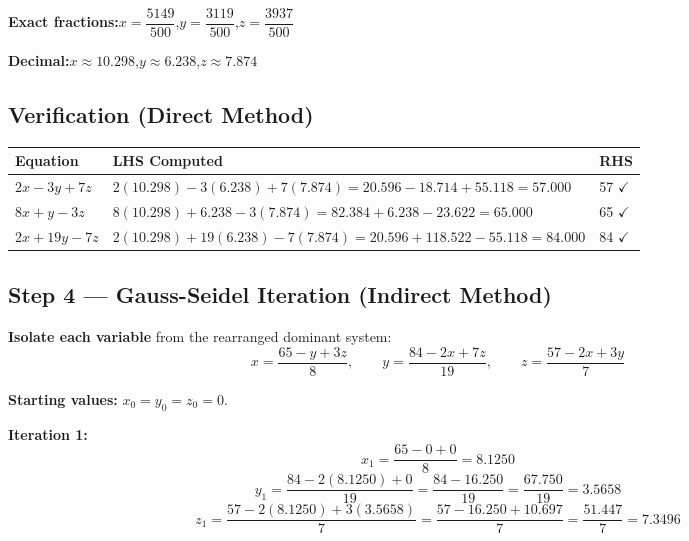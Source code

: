 \documentclass[12pt]{article}
\newcommand{\hcell}[1]{\textbf{\color{white}#1}}
\begin{document}
\begin{formulabox}
\textbf{Exact fractions:}\quad $x = \dfrac{5149}{500}$,\quad $y = \dfrac{3119}{500}$,\quad $z = \dfrac{3937}{500}$

\medskip
\textbf{Decimal:}\quad $x \approx 10.298$,\quad $y \approx 6.238$,\quad $z \approx 7.874$
\end{formulabox}

\subsection*{Verification (Direct Method)}

\begin{center}
\begin{tabular}{C{3cm} C{6.5cm} C{1.5cm}}
\toprule
{}
\hcell{Equation} & \hcell{LHS Computed} & \hcell{RHS} \\
\midrule
{}
$2x - 3y + 7z$ & $2(10.298) - 3(6.238) + 7(7.874) = 20.596 - 18.714 + 55.118 = 57.000$ & 57 $\checkmark$ \\
$8x + y - 3z$ & $8(10.298) + 6.238 - 3(7.874) = 82.384 + 6.238 - 23.622 = 65.000$ & 65 $\checkmark$ \\
$2x + 19y - 7z$ & $2(10.298) + 19(6.238) - 7(7.874) = 20.596 + 118.522 - 55.118 = 84.000$ & 84 $\checkmark$ \\
\bottomrule
\end{tabular}
\end{center}

\vspace{10pt}

\subsection*{Step 4 --- Gauss-Seidel Iteration (Indirect Method)}

\textbf{Isolate each variable} from the rearranged dominant system:
\[
  x = \frac{65 - y + 3z}{8}, \qquad y = \frac{84 - 2x + 7z}{19}, \qquad z = \frac{57 - 2x + 3y}{7}
\]

\textbf{Starting values:} $x_0 = y_0 = z_0 = 0$.

\medskip

\noindent\textbf{Iteration 1:}
\[
  x_1 = \frac{65 - 0 + 0}{8} = 8.1250
\]
\[
  y_1 = \frac{84 - 2(8.1250) + 0}{19} = \frac{84 - 16.250}{19} = \frac{67.750}{19} = 3.5658
\]
\[
  z_1 = \frac{57 - 2(8.1250) + 3(3.5658)}{7} = \frac{57 - 16.250 + 10.697}{7} = \frac{51.447}{7} = 7.3496
\]
\end{document}
